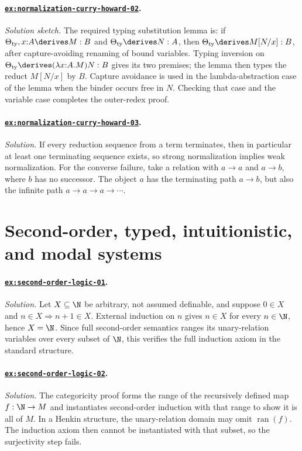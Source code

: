 \paragraph{\hyperref[ex:normalization-curry-howard-02]{\texttt{ex:normalization-curry-howard-02}}.}
\textit{Solution sketch.}  The required typing substitution lemma is: if
\(\Theta_{\mathrm{ty}},x{:}A\derives M:B\) and
\(\Theta_{\mathrm{ty}}\derives N:A\), then
\(\Theta_{\mathrm{ty}}\derives M[N/x]:B\), after capture-avoiding
renaming of bound variables.  Typing inversion on
\(\Theta_{\mathrm{ty}}\derives(\lambda x{:}A.M)N:B\) gives its two
premises; the lemma then types the reduct \(M[N/x]\) by \(B\).  Capture
avoidance is used in the lambda-abstraction case of the lemma when the
binder occurs free in \(N\).
Checking that case and the variable case completes the outer-redex proof.

\paragraph{\hyperref[ex:normalization-curry-howard-03]{\texttt{ex:normalization-curry-howard-03}}.}
\textit{Solution.}  If every reduction sequence from a term terminates, then in
particular at least one terminating sequence exists, so strong normalization
implies weak normalization.  For the converse failure, take a relation with
\(a\to a\) and \(a\to b\), where \(b\) has no successor.  The object \(a\) has
the terminating path \(a\to b\), but also the infinite path
\(a\to a\to a\to\cdots\).

\section{Second-order, typed, intuitionistic, and modal systems}

\paragraph{\hyperref[ex:second-order-logic-01]{\texttt{ex:second-order-logic-01}}.}
\textit{Solution.}  Let \(X\subseteq\N\) be arbitrary, not assumed definable,
and suppose \(0\in X\) and \(n\in X\Rightarrow n+1\in X\).  External induction
on \(n\) gives \(n\in X\) for every \(n\in\N\), hence \(X=\N\).  Since full
second-order semantics ranges its unary-relation variables over every subset of
\(\N\), this verifies the full induction axiom in the standard structure.

\paragraph{\hyperref[ex:second-order-logic-02]{\texttt{ex:second-order-logic-02}}.}
\textit{Solution.}  The categoricity proof forms the range of the recursively
defined map \(f:\N\to M\) and instantiates second-order induction with that
range to show it is all of \(M\).  In a Henkin structure, the unary-relation
domain may omit \(\operatorname{ran}(f)\).  The induction axiom then cannot be
instantiated with that subset, so the surjectivity step fails.

